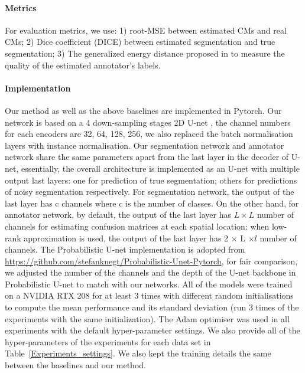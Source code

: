 \paragraph{Metrics}
For evaluation metrics, we use: 1) root-MSE between estimated CMs and real CMs; 2) Dice coefficient (DICE) between estimated segmentation and true segmentation; 3) The generalized energy distance proposed in \cite{kohl2018probabilistic} to measure the quality of the estimated annotator's labels.  


\paragraph{Implementation}
Our method as well as the above baselines are implemented in Pytorch. Our network is based on a 4 down-sampling stages 2D U-net \cite{ronneberger2015u}, the channel numbers for each encoders are 32, 64, 128, 256, we also replaced the batch normalisation layers with instance normalisation. Our segmentation network and annotator network share the same parameters apart from the last layer in the decoder of U-net, essentially, the overall architecture is implemented as an U-net with multiple output last layers: one for prediction of true segmentation; others for predictions of noisy segmentation respectively. For segmentation network, the output of the last layer has c channels where c is the number of classes. On the other hand, for annotator network, by default, the output of the last layer has  $L \times L$ number of channels for estimating confusion matrices at each spatial location; when low-rank approximation is used, the output of the last layer has 2 $\times$ L $\times l$  number of channels. The Probabilistic U-net implementation is adopted from \url{https://github.com/stefanknegt/Probabilistic-Unet-Pytorch}, for fair comparison, we adjusted the number of the channels and the depth of the U-net backbone in Probabilistic U-net to match with our networks. All of the models were trained on a NVIDIA RTX 208 for at least 3 times with different random initialisations to compute the mean performance and its standard deviation (run 3 times of the experiments with the same initialization). The Adam \cite{kingma2014adam} optimiser was used in all experiments with the default hyper-parameter settings. We also provide all of the hyper-parameters of the experiments for each data set in Table~\ref{Experiments_settings}. We also kept the training details the same between the baselines and our method.

